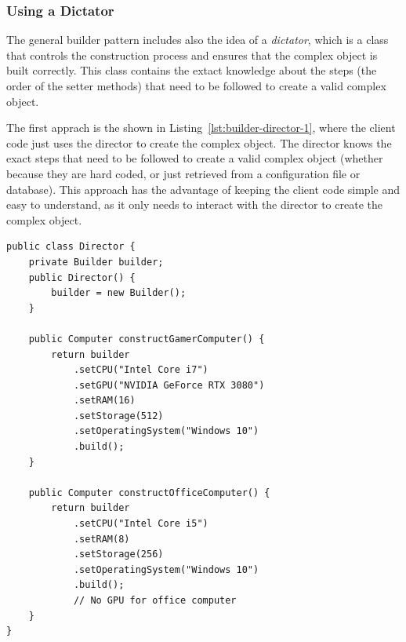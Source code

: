 \subsubsection{Using a Dictator}

The general builder pattern includes also the idea of a \emph{dictator}, which is a class that controls the construction process and ensures that the complex object is built correctly. This class contains the extact knowledge about the steps (the order of the setter methods) that need to be followed to create a valid complex object.

The first apprach is the shown in Listing~\ref{lst:builder-director-1}, where the client code just uses the director to create the complex object. The director knows the exact steps that need to be followed to create a valid complex object (whether because they are hard coded, or just retrieved from a configuration file or database). This approach has the advantage of keeping the client code simple and easy to understand, as it only needs to interact with the director to create the complex object.
\begin{listing}
    \begin{verbatim}
public class Director {
    private Builder builder;
    public Director() {
        builder = new Builder();
    }

    public Computer constructGamerComputer() {
        return builder
            .setCPU("Intel Core i7")
            .setGPU("NVIDIA GeForce RTX 3080")
            .setRAM(16)
            .setStorage(512)
            .setOperatingSystem("Windows 10")
            .build();
    }

    public Computer constructOfficeComputer() {
        return builder
            .setCPU("Intel Core i5")
            .setRAM(8)
            .setStorage(256)
            .setOperatingSystem("Windows 10")
            .build();
            // No GPU for office computer
    }
}
    \end{verbatim}
    \caption{Example of using a Director class to control the construction process of complex objects.}
    \label{lst:builder-director-1}
\end{listing}

